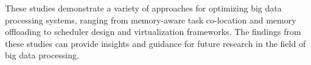 These studies demonstrate a variety of approaches for optimizing big
data processing systems, ranging from memory-aware task co-location
and memory offloading to scheduler design and virtualization
frameworks. The findings from these studies can provide insights and
guidance for future research in the field of big data processing.
\fi
